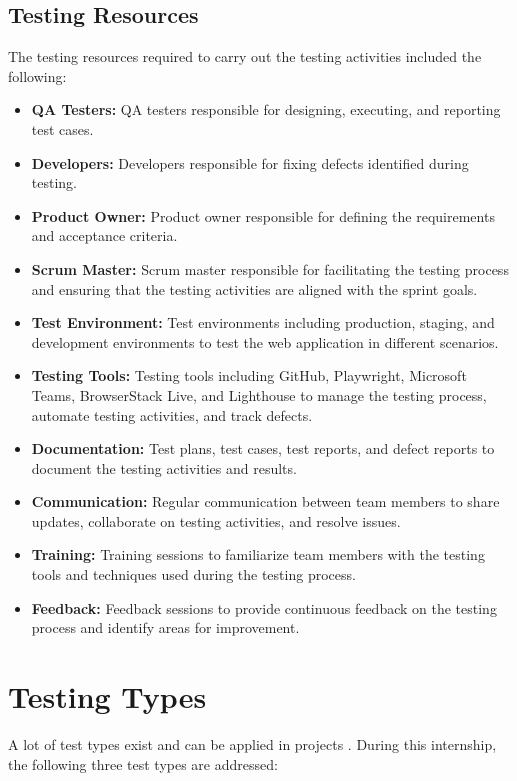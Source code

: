\subsection{Testing Resources}
The testing resources required to carry out the testing activities included the following:

\begin{itemize}
    \item \textbf{QA Testers:} QA testers responsible for designing, executing, and reporting test cases.
    \item \textbf{Developers:} Developers responsible for fixing defects identified during testing.
    \item \textbf{Product Owner:} Product owner responsible for defining the requirements and acceptance criteria.
    \item \textbf{Scrum Master:} Scrum master responsible for facilitating the testing process and ensuring that the testing activities are aligned with the sprint goals.
    \item \textbf{Test Environment:} Test environments including production, staging, and development environments to test the web application in different scenarios.
    \item \textbf{Testing Tools:} Testing tools including GitHub, Playwright, Microsoft Teams, BrowserStack Live, and Lighthouse to manage the testing process, automate testing activities, and track defects.
    \item \textbf{Documentation:} Test plans, test cases, test reports, and defect reports to document the testing activities and results.
    \item \textbf{Communication:} Regular communication between team members to share updates, collaborate on testing activities, and resolve issues.
    \item \textbf{Training:} Training sessions to familiarize team members with the testing tools and techniques used during the testing process.
    \item \textbf{Feedback:} Feedback sessions to provide continuous feedback on the testing process and identify areas for improvement.
\end{itemize}

\section{Testing Types}

A lot of test types exist and can be applied in projects \cite{istqbctfl4.0.1}. During this internship, the following three test types are
addressed:

